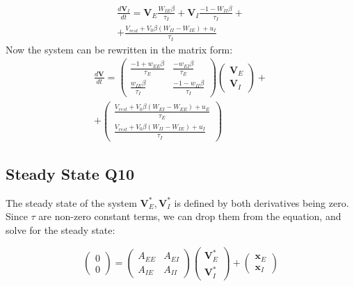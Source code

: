 \documentclass[10pt,twocolumn]{article}
\begin{document}
$$
    \begin{align*}
        \frac{d\textbf{V}_I}{dt}
        = \textbf{V}_E\boxed{\frac{W_{IE}\beta}{\tau_I}}
        + \textbf{V}_I\boxed{\frac{-1 - W_{II}\beta}{\tau_I}}+
        \\
        + \boxed{\frac{V_{rest} + V_0\beta(W_{II}-W_{IE}) + u_I}{\tau_I}}
    \end{align*}
$$
Now the system can be rewritten in the matrix form:
$$
    \begin{align*}
        \frac{d\textbf{V}}{dt}
        =
        \begin{pmatrix}
            \frac{-1 + w_{EE}\beta}{\tau_E} & \frac{-w_{EI}\beta}{\tau_E}     \\
            \frac{w_{IE}\beta}{\tau_I}      & \frac{-1 - w_{II}\beta}{\tau_I}
        \end{pmatrix}
        \begin{pmatrix}
            \textbf{V}_E \\ \textbf{V}_I
        \end{pmatrix}+
        \\
        +
        \begin{pmatrix}
            \frac{V_{rest} + V_0\beta(W_{EI}-W_{EE}) + u_E}{\tau_E} \\
            \frac{V_{rest} + V_0\beta(W_{II}-W_{IE}) + u_I}{\tau_I}
        \end{pmatrix}
    \end{align*}
$$


\subsection{Steady State Q10}
The steady state of the system $\textbf{V}^\ast_E,\textbf{V}^\ast_I$ is defined  by
both derivatives being zero. Since $\tau$ are non-zero constant terms, we can drop
them from the equation, and solve for the steady state:

$$
    \begin{pmatrix}
        0 \\ 0
    \end{pmatrix}
    =
    \begin{pmatrix}
        A_{EE} & A_{EI} \\
        A_{IE} & A_{II}
    \end{pmatrix}
    \begin{pmatrix}
        \textbf{V}^\ast_E \\ \textbf{V}^\ast_I
    \end{pmatrix}+
    \begin{pmatrix}
        \textbf{x}_E \\ \textbf{x}_I
    \end{pmatrix}
$$
\end{document}
